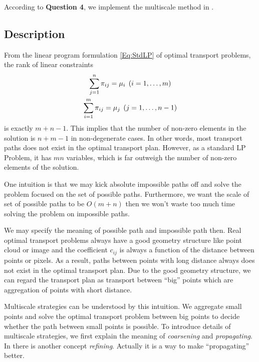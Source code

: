 \documentclass[english]{pkupaper}
\begin{document}
According to \textbf{Question 4}, we implement the multiscale method in \parencite{Gerber2017}.

\subsection{Description}

From the linear program formulation \eqref{Eq:StdLP} of optimal transport problems, the rank of linear constraints 
\begin{gather}
\sum_{j=1}^n \pi_{ij} = \mu_i \mathbin{}\left(  i=1,\dots,m  \right)\\
\sum_{i=1}^m \pi_{ij} = \mu_j \mathbin{}\left(  j=1,\dots,n-1 \right)
\end{gather}
is exactly $m+n-1$. This implies that the number of non-zero elements in the solution is $n+m-1$ in non-degenerate cases. In other words, most transport paths does not exist in the optimal transport plan. 
However, as a standard LP Problem, it has $m n $ variables, which is far outweigh the number of non-zero elements of the solution.

One intuition is that we may kick absolute impossible paths off and solve the problem focused on the set of possible paths. Furthermore, we want the scale of set of possible paths to be $O(m+n)$ then we won't waste too much time solving the problem on impossible paths.

We may specify the meaning of possible path and impossible path then. Real optimal transport problems always have a good geometry structure like point cloud or image and the coefficient $c_{ij}$ is always a function of the distance between points or pixels. As a result, paths between points with long distance always does not exist in the optimal transport plan. Due to the good geometry structure, we can regard the transport plan as transport between ``big'' points which are aggregation of points with short distance.

Multiscale strategies can be understood by this intuition. We aggregate small points and solve the optimal transport problem between big points to decide whether the path between small points is possible. To introduce details of multiscale strategies, we first explain the meaning of \emph{coarsening} and \emph{propagating}. In \parencite{Gerber2017} there is another concept \emph{refining}. Actually it is a way to make ``propagating'' better.
\end{document}
